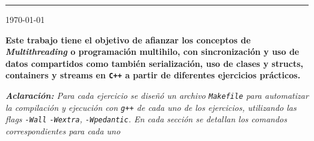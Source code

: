 \documentclass[11pt, a4paper]{article}
\begin{document}
{\noindent\rule{\textwidth}{0.5pt}}


\begin{center}
    {\large \today}
\end{center}

{\bfseries\selectfont Este trabajo tiene el objetivo de afianzar los conceptos de
\textit{Multithreading} o programación multihilo, con sincronización y uso de datos compartidos como también serialización, uso de clases y structs, containers y streams en \lstinline|C++| a partir de diferentes ejercicios prácticos.
}
\begin{center}
    \small\itshape\textbf{Aclaración:} Para cada ejercicio se diseñó un archivo \lstinline|Makefile| para automatizar la compilación y ejecución con \lstinline|g++| de cada uno de los ejercicios, utilizando las flags \lstinline|-Wall| \lstinline|-Wextra|, \lstinline|-Wpedantic|. En cada sección se detallan los comandos correspondientes para cada uno 
\end{center}
\end{document}

